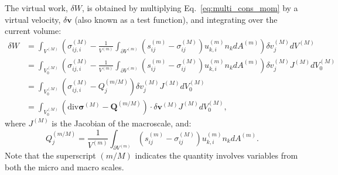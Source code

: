 The virtual work, $\delta W$, is obtained by multiplying Eq.\ \eqref{eq:multi_cons_mom} by a virtual velocity, $\delta \pmb{v}$ (also known as a test function), and integrating over the current volume:
%
\begin{align}
\delta W &= \int_{V^{(M)}} \left(\sigma_{ij,i}^{(M)} - \frac{1}{V^{(m)}} \int_{\partial V^{(m)}} \left( s_{ij}^{(m)} - \sigma_{ij}^{(M)} \right)u_{k,i}^{(m)} n_k dA^{(m)} \right)  \delta v_j^{(M)}  dV^{(M)} \nonumber\\
%
&= \int_{V_0^{(M)}} \left(\sigma_{ij,i}^{(M)} - \frac{1}{V^{(m)}} \int_{\partial V^{(m)}} \left( s_{ij}^{(m)} - \sigma_{ij}^{(M)} \right)u_{k,i}^{(m)} n_k dA^{(m)} \right)  \delta v_j^{(M)}J^{(M)} dV_0^{(M)}  \nonumber\\
%
&= \int_{V_0^{(M)}} \left(\sigma_{ij,i}^{(M)} - Q_j^{(m/M)} \right) \delta v_j^{(M)}J^{(M)} dV_0^{(M)}   \nonumber\\
%
&= \int_{V_0^{(M)}} \left(\text{div}\pmb{\sigma}^{(M)} - \pmb{Q}^{(m/M)} \right)  \cdot \delta \pmb{v}^{(M)}J^{(M)} dV_0^{(M)} ,
\label{eq:virtual_work}
\end{align}
%
where \(J^{(M)}\) is the Jacobian of the macroscale, and:
%
\begin{equation}
Q_j^{(m/M)} = \frac{1}{V^{(m)}} \int_{\partial V^{(m)}} \left( s_{ij}^{(m)} - \sigma_{ij}^{(M)} \right)u_{k,i}^{(m)} n_k dA^{(m)}.
\end{equation}
%
Note that the superscript $(m/M)$ indicates the quantity involves variables from both the micro and macro scales. 

